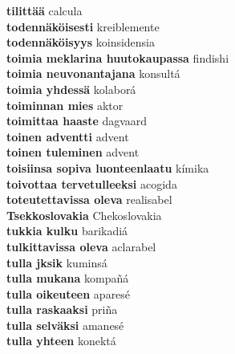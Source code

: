 \textbf{ tilittää  } calcula \\
\textbf{ todennäköisesti  } kreiblemente \\
\textbf{ todennäköisyys  } koinsidensia \\
\textbf{ toimia meklarina huutokaupassa  } findishi \\
\textbf{ toimia neuvonantajana  } konsultá \\
\textbf{ toimia yhdessä  } kolaborá \\
\textbf{ toiminnan mies  } aktor \\
\textbf{ toimittaa haaste  } dagvaard \\
\textbf{ toinen adventti  } advent \\
\textbf{ toinen tuleminen  } advent \\
\textbf{ toisiinsa sopiva luonteenlaatu  } kímika \\
\textbf{ toivottaa tervetulleeksi  } acogida \\
\textbf{ toteutettavissa oleva  } realisabel \\
\textbf{ Tsekkoslovakia  } Chekoslovakia \\
\textbf{ tukkia kulku  } barikadiá \\
\textbf{ tulkittavissa oleva  } aclarabel \\
\textbf{ tulla jksik  } kuminsá \\
\textbf{ tulla mukana  } kompañá \\
\textbf{ tulla oikeuteen  } aparesé \\
\textbf{ tulla raskaaksi  } priña \\
\textbf{ tulla selväksi  } amanesé \\
\textbf{ tulla yhteen  } konektá \\
